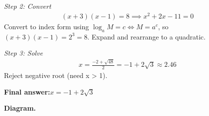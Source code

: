 \documentclass[11pt]{article}
\begin{document}
\textit{Step 2: Convert}
\[\begin{gathered}
(x+3)(x-1) = 8 \implies x^2 + 2x - 11 = 0
\end{gathered}\]
Convert to index form using \( \log_a M = c \Leftrightarrow M = a^c \), so \( (x+3)(x-1) = 2^3 = 8 \). Expand and rearrange to a quadratic.

\textit{Step 3: Solve}
\[\begin{gathered}
x = \frac{-2 + \sqrt{48}}{2} = -1 + 2\sqrt{3} \approx 2.46
\end{gathered}\]
Reject negative root (need x > 1).

\begin{answerbox}
\textbf{Final answer:}\quad \(\displaystyle x = -1 + 2\sqrt{3}\)
\end{answerbox}
\textbf{Diagram.}
\end{document}
